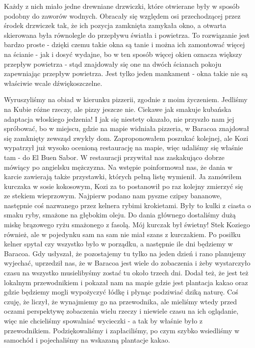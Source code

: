 Każdy z nich miało jedne drewniane drzwiczki, które otwierane były w sposób podobny do zaworów wodnych.
Obracały się względem osi przechodzącej przez środek drzwiczek tak, że ich pozycja zamknięta zamykała okno, a otwarta skierowana była równolegle do przepływu światła i powietrza.
To rozwiązanie jest bardzo proste - dzięki czemu takie okna są tanie i można ich zamontować więcej na ścianie - jak i dosyć wydajne, bo w ten sposób więcej okien oznacza większy przepływ powietrza - stąd znajdowały się one na dwóch ścianach pokoju zapewniając przepływ powietrza.
Jest tylko jeden mankament - okna takie nie są właściwie wcale dźwiękoszczelne.
\par Wyruszyliśmy na obiad w kierunku pizzerii, zgodnie z moim życzeniem.
Jedliśmy na Kubie różne rzeczy, ale pizzy jeszcze nie.
Ciekawe jak smakuje kubańska adaptacja włoskiego jedzenia!
I jak się niestety okazało, nie przyszło nam jej spróbować, bo w miejscu, gdzie na mapie widniała pizzeria, w Baracoa znajdował się zamknięty zewsząd zwykły dom.
Zaproponowałem poszukać kolejnej, ale Kozi wypatrzył już wysoko ocenioną restaurację na mapie, więc udaliśmy się właśnie tam - do El Buen Sabor.
W restauracji przywitał nas zaskakująco dobrze mówiący po angielsku mężczyzna.
Na wstępie poinformował nas, że dania w karcie zawierają także przystawki, których pełną listę wymienił.
Ja zamówiłem kurczaka w sosie kokosowym, Kozi za to postanowił po raz kolejny zmierzyć się ze stekiem wieprzowym.
Najpierw podano nam pyszne czipsy bananowe, następnie coś nazwanego przez kelnera rybimi krokietami.
Były to kulki z ciasta o smaku ryby, smażone na głębokim oleju.
Do dania głównego dostaliśmy dużą miskę brązowego ryżu smażonego z fasolą.
Mój kurczak był świetny!
Stek Koziego również, ale w pojedynku sam na sam nie miał szans z kurczakiem.
Po posiłku kelner spytał czy wszystko było w porządku, a następnie ile dni będziemy w Baracoa.
Gdy usłyszał, że pozostajemy tu tylko na jeden dzień i rano planujemy wyjechać, uprzedził nas, że w Baracoa jest wiele do zobaczenia i żeby wystarczyło czasu na wszystko musielibyśmy zostać tu około trzech dni.
Dodał też, że jest też lokalnym przewodnikiem i pokazał nam na mapie gdzie jest plantacja kakao oraz gdzie będziemy mogli wypożyczyć łódkę i płynąc podziwiać dziką naturę.
Coś czuję, że liczył, że wynajmiemy go na przewodnika, ale mieliśmy wtedy przed oczami perspektywę zobaczenia wielu rzeczy i niewiele czasu na ich oglądanie, więc nie chcieliśmy spowalniać wycieczki - a tak by właśnie było z przewodnikiem.
Podziękowaliśmy i zapłaciliśmy, po czym szybko wsiedliśmy w samochód i pojechaliśmy na wskazaną plantacje kakao.

